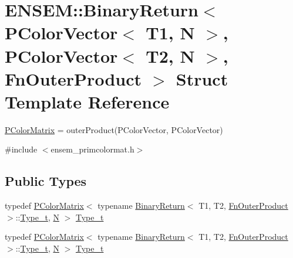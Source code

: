 \hypertarget{structENSEM_1_1BinaryReturn_3_01PColorVector_3_01T1_00_01N_01_4_00_01PColorVector_3_01T2_00_01N_01_4_00_01FnOuterProduct_01_4}{}\section{E\+N\+S\+EM\+:\+:Binary\+Return$<$ P\+Color\+Vector$<$ T1, N $>$, P\+Color\+Vector$<$ T2, N $>$, Fn\+Outer\+Product $>$ Struct Template Reference}
\label{structENSEM_1_1BinaryReturn_3_01PColorVector_3_01T1_00_01N_01_4_00_01PColorVector_3_01T2_00_01N_01_4_00_01FnOuterProduct_01_4}


\mbox{\hyperlink{classENSEM_1_1PColorMatrix}{P\+Color\+Matrix}} = outer\+Product(\+P\+Color\+Vector, P\+Color\+Vector)  




{\ttfamily \#include $<$ensem\+\_\+primcolormat.\+h$>$}

\subsection*{Public Types}
\begin{DoxyCompactItemize}
\item 
typedef \mbox{\hyperlink{classENSEM_1_1PColorMatrix}{P\+Color\+Matrix}}$<$ typename \mbox{\hyperlink{structENSEM_1_1BinaryReturn}{Binary\+Return}}$<$ T1, T2, \mbox{\hyperlink{structENSEM_1_1FnOuterProduct}{Fn\+Outer\+Product}} $>$\+::\mbox{\hyperlink{structENSEM_1_1BinaryReturn_3_01PColorVector_3_01T1_00_01N_01_4_00_01PColorVector_3_01T2_00_01N_01_4_00_01FnOuterProduct_01_4_a7650dfea24e42c0184a3b25c77d5da81}{Type\+\_\+t}}, \mbox{\hyperlink{operator__name__util_8cc_a7722c8ecbb62d99aee7ce68b1752f337}{N}} $>$ \mbox{\hyperlink{structENSEM_1_1BinaryReturn_3_01PColorVector_3_01T1_00_01N_01_4_00_01PColorVector_3_01T2_00_01N_01_4_00_01FnOuterProduct_01_4_a7650dfea24e42c0184a3b25c77d5da81}{Type\+\_\+t}}
\item 
typedef \mbox{\hyperlink{classENSEM_1_1PColorMatrix}{P\+Color\+Matrix}}$<$ typename \mbox{\hyperlink{structENSEM_1_1BinaryReturn}{Binary\+Return}}$<$ T1, T2, \mbox{\hyperlink{structENSEM_1_1FnOuterProduct}{Fn\+Outer\+Product}} $>$\+::\mbox{\hyperlink{structENSEM_1_1BinaryReturn_3_01PColorVector_3_01T1_00_01N_01_4_00_01PColorVector_3_01T2_00_01N_01_4_00_01FnOuterProduct_01_4_a7650dfea24e42c0184a3b25c77d5da81}{Type\+\_\+t}}, \mbox{\hyperlink{operator__name__util_8cc_a7722c8ecbb62d99aee7ce68b1752f337}{N}} $>$ \mbox{\hyperlink{structENSEM_1_1BinaryReturn_3_01PColorVector_3_01T1_00_01N_01_4_00_01PColorVector_3_01T2_00_01N_01_4_00_01FnOuterProduct_01_4_a7650dfea24e42c0184a3b25c77d5da81}{Type\+\_\+t}}
\end{DoxyCompactItemize}


